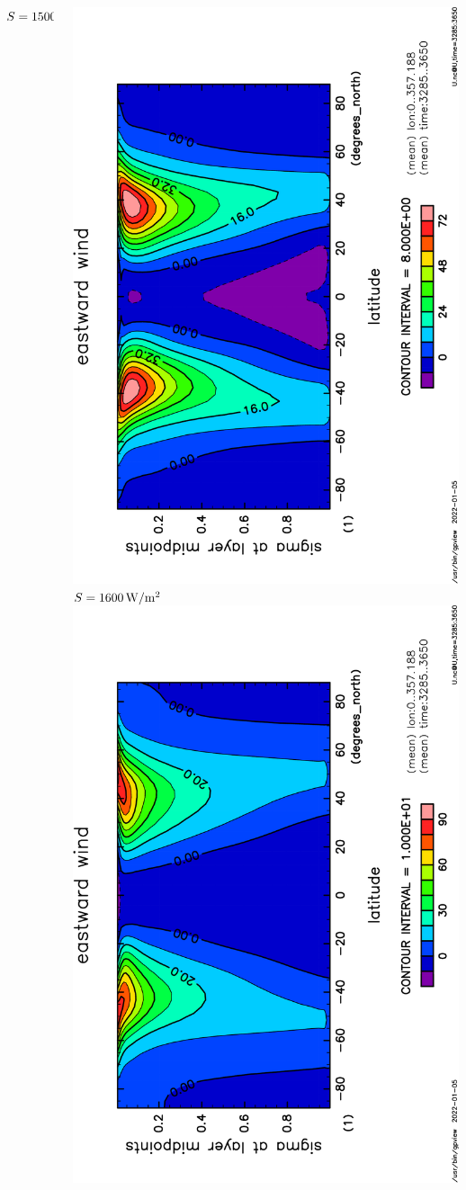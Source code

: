 \documentclass[aspectratio=149,9pt,fleqn]{beamer}
\begin{document}
\begin{frame}
\begin{columns}[T]
\begin{column}{.3\textwidth}
			\(S=1500\hmu{W/m^2}\)
		\end{column}
		\begin{column}{.3\textwidth}
			\centering
			\includegraphics[height=\textwidth,angle=-90]{S1600/U,time=3285:3650-crop.pdf}
			\(S=1600\hmu{W/m^2}\)\\
			\includegraphics[height=\textwidth,angle=-90]{S1800/U,time=3285:3650-crop.pdf}

\end{column}
\end{columns}
\end{frame}
\end{document}
